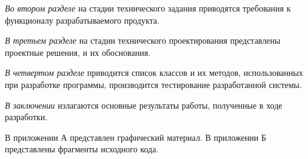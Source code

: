 \textit{Во втором разделе} на стадии технического задания приводятся требования к функционалу разрабатываемого продукта.

\textit{В третьем разделе} на стадии технического проектирования представлены проектные решения, и их обоснования.

\textit{В четвертом разделе} приводится список классов и их методов, использованных при разработке программы, производится тестирование разработанной системы.

\textit{В заключении} излагаются основные результаты работы, полученные в ходе разработки.

В приложении А представлен графический материал. В приложении Б представлены фрагменты исходного кода.